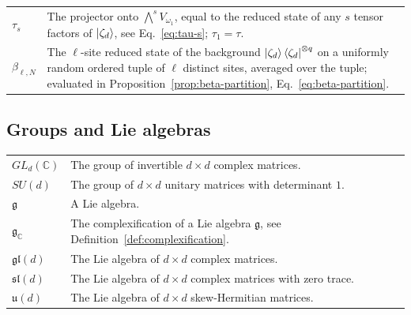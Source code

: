 \documentclass[10pt,twocolumn,superscriptaddress,aps,amsmath,amssymb,citeautoscript,floatfix,prx]{revtex4-2}
\newcounter{alg}
\theoremstyle{plain}
\theoremstyle{plain}
\theoremstyle{plain}
\theoremstyle{plain}
\theoremstyle{plain}
\theoremstyle{plain}
\newcommand{\C}{\mathbb{C}}
\theoremstyle{plain}
\theoremstyle{definition}
\theoremstyle{plain}
\begin{document}
\begin{appendix}
\begin{tabular}{@{}ll@{}}
\parbox[t]{0.22\textwidth}{$\tau_s$} & \parbox[t]{0.72\textwidth}{The projector onto $\bigwedge^sV_{\omega_1}$, equal to the reduced state of any $s$ tensor factors of $\ket{\zeta_d}$, see Eq.~\eqref{eq:tau-s}; $\tau_1=\tau$.} \\[0.6em]

\parbox[t]{0.22\textwidth}{$\beta_{\ell,N}$} & \parbox[t]{0.72\textwidth}{The $\ell$-site reduced state of the background $\ket{\zeta_d}\bra{\zeta_d}^{\otimes q}$ on a uniformly random ordered tuple of $\ell$ distinct sites, averaged over the tuple; evaluated in Proposition~\ref{prop:beta-partition}, Eq.~\eqref{eq:beta-partition}.} \\[0.6em]

\end{tabular}


\subsection*{Groups and Lie algebras}

\begin{tabular}{@{}ll@{}}

\parbox[t]{0.22\textwidth}{$GL_d(\mathbb{C})$} & \parbox[t]{0.72\textwidth}{The group of invertible $d \times d$ complex matrices.} \\[0.6em]

\parbox[t]{0.22\textwidth}{$SU(d)$} & \parbox[t]{0.72\textwidth}{The group of $d \times d$ unitary matrices with determinant $1$.} \\[0.6em]

\parbox[t]{0.22\textwidth}{$\mathfrak{g}$} & \parbox[t]{0.72\textwidth}{A Lie algebra.} \\[0.6em]

\parbox[t]{0.22\textwidth}{$\mathfrak{g}_\C$} & \parbox[t]{0.72\textwidth}{The complexification of a Lie algebra $\mathfrak{g}$, see Definition~\ref{def:complexification}.} \\[0.6em]

\parbox[t]{0.22\textwidth}{$\mathfrak{gl}(d)$} & \parbox[t]{0.72\textwidth}{The Lie algebra of $d \times d$ complex matrices.} \\[0.6em]

\parbox[t]{0.22\textwidth}{$\mathfrak{sl}(d)$} & \parbox[t]{0.72\textwidth}{The Lie algebra of $d \times d$ complex matrices with zero trace.} \\[0.6em]

\parbox[t]{0.22\textwidth}{$\mathfrak{u}(d)$} & \parbox[t]{0.72\textwidth}{The Lie algebra of $d \times d$ skew-Hermitian matrices.} \\[0.6em]


\end{tabular}
\end{appendix}
\end{document}
